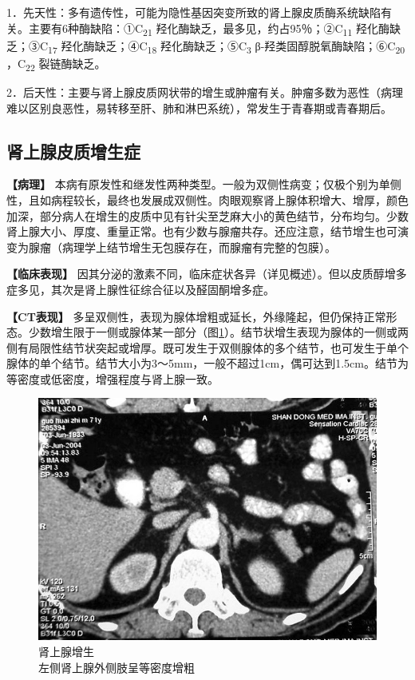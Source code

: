 1．先天性：多有遗传性，可能为隐性基因突变所致的肾上腺皮质酶系统缺陷有关。主要有6种酶缺陷：①C\textsubscript{21}
羟化酶缺乏，最多见，约占95％；②C\textsubscript{11}
羟化酶缺乏；③C\textsubscript{17} 羟化酶缺乏；④C\textsubscript{18}
羟化酶缺乏；⑤C\textsubscript{3}
β-羟类固醇脱氧酶缺陷；⑥C\textsubscript{20} ，C\textsubscript{22}
裂链酶缺乏。

2．后天性：主要与肾上腺皮质网状带的增生或肿瘤有关。肿瘤多数为恶性（病理难以区别良恶性，易转移至肝、肺和淋巴系统），常发生于青春期或青春期后。

\subsection{肾上腺皮质增生症}

\textbf{【病理】}
本病有原发性和继发性两种类型。一般为双侧性病变；仅极个别为单侧性，且如病程较长，最终也发展成双侧性。肉眼观察肾上腺体积增大、增厚，颜色加深，部分病人在增生的皮质中见有针尖至芝麻大小的黄色结节，分布均匀。少数肾上腺大小、厚度、重量正常。也有少数与腺瘤共存。还应注意，结节增生也可演变为腺瘤（病理学上结节增生无包膜存在，而腺瘤有完整的包膜）。

\textbf{【临床表现】}
因其分泌的激素不同，临床症状各异（详见概述）。但以皮质醇增多症多见，其次是肾上腺性征综合征以及醛固酮增多症。

\textbf{【CT表现】}
多呈双侧性，表现为腺体增粗或延长，外缘隆起，但仍保持正常形态。少数增生限于一侧或腺体某一部分（图\ref{fig16-1}）。结节状增生表现为腺体的一侧或两侧有局限性结节状突起或增厚。既可发生于双侧腺体的多个结节，也可发生于单个腺体的单个结节。结节大小为3～5mm，一般不超过1cm，偶可达到1.5cm。结节为等密度或低密度，增强程度与肾上腺一致。

\begin{figure}[!htbp]
 \centering
 \includegraphics[width=.7\textwidth,height=\textheight,keepaspectratio]{./images/Image00345.jpg}
 \captionsetup{justification=centering}
 \caption{肾上腺增生\\{\small 左侧肾上腺外侧肢呈等密度增粗}}
 \label{fig16-1}
  \end{figure} 

